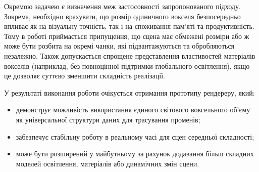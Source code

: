 Окремою задачею є визначення меж застосовності запропонованого підходу. Зокрема, необхідно врахувати, що розмір одиничного вокселя безпосередньо впливає як на візуальну точність, так і на споживання пам'яті та продуктивність. Тому в роботі приймається припущення, що сцена має обмежені розміри або ж може бути розбита на окремі чанки, які підвантажуються та обробляються незалежно. Також допускається спрощене представлення властивостей матеріалів вокселів (наприклад, без повноцінної підтримки глобального освітлення), якщо це дозволяє суттєво зменшити складність реалізації.

У результаті виконання роботи очікується отримання прототипу рендереру, який:

\begin{itemize}[itemsep=0pt, topsep=0pt, label=$\diamond$]
\item демонструє можливість використання єдиного світового воксельного \linebreak об'єму як універсальної структури даних для трасування променів;
\item забезпечує стабільну роботу в реальному часі для сцен середньої складності;
\item може бути розширений у майбутньому за рахунок додавання більш складних моделей освітлення, матеріалів або динамічних змін сцени.
\end{itemize}